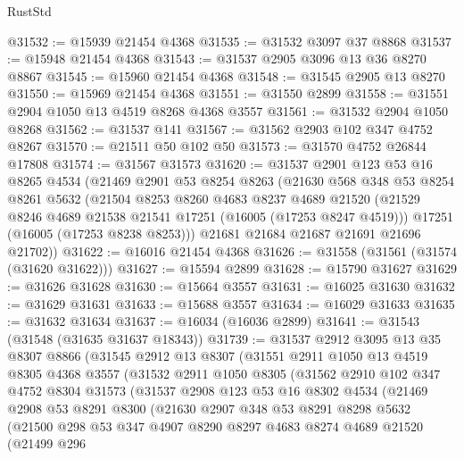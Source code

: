 \begin{lexlean}{RustStd}
\begin{coremodule}
@31532 := @15939 @21454 @4368
@31535 := @31532 @3097 @37 @8868
@31537 := @15948 @21454 @4368
@31543 := @31537 @2905 @3096 @13 @36 @8270 @8867
@31545 := @15960 @21454 @4368
@31548 := @31545 @2905 @13 @8270
@31550 := @15969 @21454 @4368
@31551 := @31550 @2899
@31558 := @31551 @2904 @1050 @13 @4519 @8268 @4368 @3557
@31561 := @31532 @2904 @1050 @8268
@31562 := @31537 @141
@31567 := @31562 @2903 @102 @347 @4752 @8267
@31570 := @21511 @50 @102 @50
@31573 := @31570 @4752 @26844 @17808
@31574 := @31567 @31573
@31620 := @31537
    @2901
    @123
    @53
    @16
    @8265
    @4534
    (@21469
      @2901
      @53
      @8254
      @8263
      (@21630
        @568
        @348
        @53
        @8254
        @8261
        @5632
        (@21504
          @8253
          @8260
          @4683
          @8237
          @4689
          @21520
          (@21529 @8246 @4689 @21538 @21541 @17251 (@16005 (@17253 @8247 @4519)))
          @17251
          (@16005 (@17253 @8238 @8253)))
        @21681
        @21684
        @21687
        @21691
        @21696
        @21702))
@31622 := @16016 @21454 @4368
@31626 := @31558 (@31561 (@31574 (@31620 @31622)))
@31627 := @15594 @2899
@31628 := @15790 @31627
@31629 := @31626 @31628
@31630 := @15664 @3557
@31631 := @16025 @31630
@31632 := @31629 @31631
@31633 := @15688 @3557
@31634 := @16029 @31633
@31635 := @31632 @31634
@31637 := @16034 (@16036 @2899)
@31641 := @31543 (@31548 (@31635 @31637 @18343))
@31739 := @31537
    @2912
    @3095
    @13
    @35
    @8307
    @8866
    (@31545
      @2912
      @13
      @8307
      (@31551
        @2911
        @1050
        @13
        @4519
        @8305
        @4368
        @3557
        (@31532
          @2911
          @1050
          @8305
          (@31562
            @2910
            @102
            @347
            @4752
            @8304
            @31573
            (@31537
              @2908
              @123
              @53
              @16
              @8302
              @4534
              (@21469
                @2908
                @53
                @8291
                @8300
                (@21630
                  @2907
                  @348
                  @53
                  @8291
                  @8298
                  @5632
                  (@21500
                    @298
                    @53
                    @347
                    @4907
                    @8290
                    @8297
                    @4683
                    @8274
                    @4689
                    @21520
                    (@21499
                      @296

\end{coremodule}
\end{lexlean}
